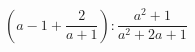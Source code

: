 \begin{ex}[type=expression]
	\begin{condition}
		\( \left( a-1+\dfrac{2}{a+1} \right):\dfrac{a^2+1}{a^2+2a+1} \)
	\end{condition}
\end{ex}